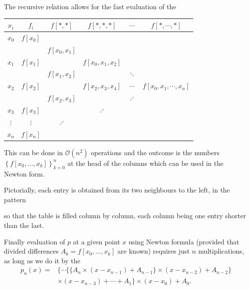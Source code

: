\documentclass[a4paper]{scrartcl}
\begin{document}
The recursive relation allows for the fast evaluation of the 
\begin{center}
  \begin{tabular}{cccccc}
    \toprule
    $x_i$ & $f_i$ & $f[*, *]$ & $f[*, *, *]$ & $\cdots$ & $f[*, \cdots,*]$\\
    \midrule
    $x_0$ & $f[x_0]$\\
    & & $f[x_0, x_1]$\\
    $x_1$ & $f[x_1]$ & & $f[x_0, x_1, x_2]$ \\
    & & $f[x_1, x_2]$ & & $\ddots$\\
    $x_2$ & $f[x_2]$ & & $f[x_2, x_3, x_4]$ & $\cdots$ & $f[x_0, x_1, \cdots, x_n]$\\
    & & $f[x_2, x_3]$ & & $\iddots$\\
    $x_3$ & $f[x_3]$ & & $\iddots$\\
    $\vdots$ & $\vdots$ & $\iddots$ &\\
    $x_n$ & $f[x_n]$\\
    \bottomrule
  \end{tabular}
\end{center}
This can be done in $\mathcal{O}\left(n^{2}\right)$ operations and the outcome is the numbers $\left\{f\left[x_{0}, \ldots, x_{k}\right]\right\}_{k=0}^{n}$ at the head of the columns which can be used in the Newton form.

Pictorially, each entry is obtained from its two neighbours to the left, in the pattern
\begin{center}
\end{center}
so that the table is filled column by column, each column being one entry shorter than the last.

Finally evaluation of $p$ at a given point $x$ using Newton formula (provided that divided differences $A_k = f[x_0, \dots, x_k]$ are known) requires just $n$ multiplications, as long as we do it by the 
\begin{align*}
p_{n}(x)=&\{\cdots\{\{A_{n} \times(x-x_{n-1})+A_{n-1}\} \times(x-x_{n-2})+A_{n-2}\} \\
& \times(x-x_{n-3})+\cdots+A_{1}\} \times(x-x_{0})+A_{0} .
\end{align*}
\end{document}
